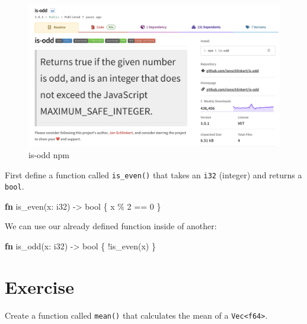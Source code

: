 \documentclass[
  letterpaper,
  DIV=11,
  numbers=noendperiod,
  oneside]{scrreprt}
\newenvironment{Shaded}{\begin{snugshade}}{\end{snugshade}}
\newcommand{\DataTypeTok}[1]{\textcolor[rgb]{0.68,0.00,0.00}{#1}}
\newcommand{\DecValTok}[1]{\textcolor[rgb]{0.68,0.00,0.00}{#1}}
\newcommand{\KeywordTok}[1]{\textcolor[rgb]{0.00,0.23,0.31}{\textbf{#1}}}
\newcommand{\NormalTok}[1]{\textcolor[rgb]{0.00,0.23,0.31}{#1}}
\newcommand{\OperatorTok}[1]{\textcolor[rgb]{0.37,0.37,0.37}{#1}}
\begin{document}
\begin{figure}[H]

{\centering \includegraphics[width=0.7\linewidth,height=\textheight,keepaspectratio]{images/is-odd.png}

}

\caption{is-odd npm}

\end{figure}%

First define a function called \texttt{is\_even()} that takes an
\texttt{i32} (integer) and returns a \texttt{bool}.

\begin{Shaded}
\begin{Highlighting}[]
\KeywordTok{fn}\NormalTok{ is\_even(x}\OperatorTok{:} \DataTypeTok{i32}\NormalTok{) }\OperatorTok{{-}\textgreater{}} \DataTypeTok{bool} \OperatorTok{\{}
\NormalTok{    x }\OperatorTok{\%} \DecValTok{2} \OperatorTok{==} \DecValTok{0}
\OperatorTok{\}}
\end{Highlighting}
\end{Shaded}

We can use our already defined function inside of another:

\begin{Shaded}
\begin{Highlighting}[]
\KeywordTok{fn}\NormalTok{ is\_odd(x}\OperatorTok{:} \DataTypeTok{i32}\NormalTok{) }\OperatorTok{{-}\textgreater{}} \DataTypeTok{bool} \OperatorTok{\{}
    \OperatorTok{!}\NormalTok{is\_even(x)}
\OperatorTok{\}}
\end{Highlighting}
\end{Shaded}

\section{Exercise}\label{exercise-6}

Create a function called \texttt{mean()} that calculates the mean of a
\texttt{Vec\textless{}f64\textgreater{}}.
\end{document}
